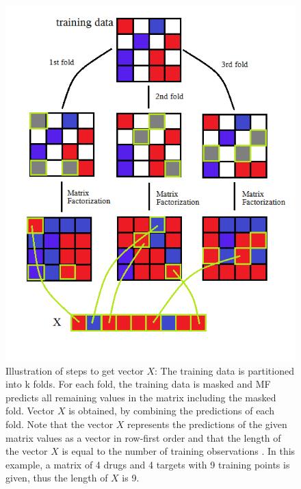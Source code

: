 \begin{figure}
\begin{center}
\includegraphics[scale=0.6]{ccrf_X.png}
\end{center}
\caption[Illustrations of steps to get vector $X$]{Illustration of steps to get vector $X$: The training data is partitioned into k folds. For each fold, the training data is masked and MF predicts all remaining values in the matrix including the masked fold. Vector $X$ is obtained, by combining the predictions of each fold. Note that the vector $X$ represents the predictions of the given matrix values as a vector in row-first order and that the length of the vector $X$ is equal to the number of training observations . In this example, a matrix of 4 drugs and 4 targets with 9 training points is given, thus the length of $X$ is 9.}
\label{fig:ccrf_X}
\end{figure}


